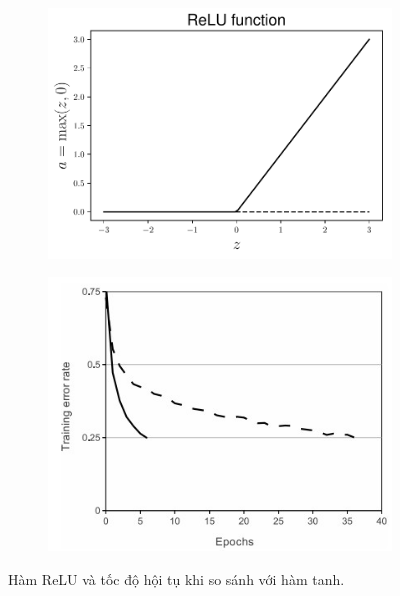 \begin{figure}[t]
\begin{subfigure}{0.49\textwidth}
\includegraphics[width=0.99\linewidth]{ebookML_src/src/mlp/relu.pdf}
\caption{}
\label{fig:14_6a}
\end{subfigure}
\begin{subfigure}{0.49\textwidth}
\includegraphics[width=0.99\linewidth]{Chapters/05_NeuralNetworks/14_mlp/alexplot.jpeg}
\caption{}
\label{fig:14_6b}
\end{subfigure}
\caption{
Hàm ReLU và tốc độ hội tụ khi so sánh với hàm tanh.
}
\label{fig:14_6}
\end{figure}

